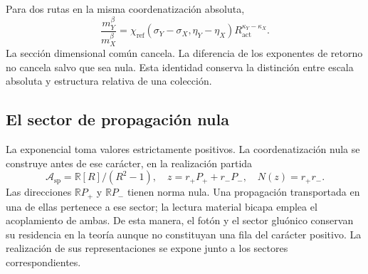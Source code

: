 Para dos rutas en la misma coordenatización absoluta,
\[
 \frac{m_Y^\beta}{m_X^\beta}
 =\chi_{\mathrm{ref}}(\sigma_Y-\sigma_X,\eta_Y-\eta_X)
 R_{\mathrm{act}}^{\kappa_Y-\kappa_X}.
\]
La sección dimensional común cancela. La diferencia de los exponentes de
retorno no cancela salvo que sea nula. Esta identidad conserva la
distinción entre escala absoluta y estructura relativa de una colección.

\subsection{El sector de propagación nula}

La exponencial toma valores estrictamente positivos. La coordenatización nula se
construye antes de ese carácter, en la realización partida
\[
 \mathcal A_{\mathrm{sp}}=\mathbb R[R]/(R^2-1),\quad
 z=r_+P_++r_-P_-,\quad N(z)=r_+r_-.
\]
Las direcciones \(\mathbb RP_+\) y \(\mathbb RP_-\) tienen norma
nula. Una propagación transportada en una de ellas pertenece a ese sector;
la lectura material bicapa emplea el acoplamiento de ambas. De esta manera,
el fotón y el sector gluónico conservan su residencia en la teoría aunque
no constituyan una fila del carácter positivo. La realización de sus
representaciones se expone junto a los sectores correspondientes.
